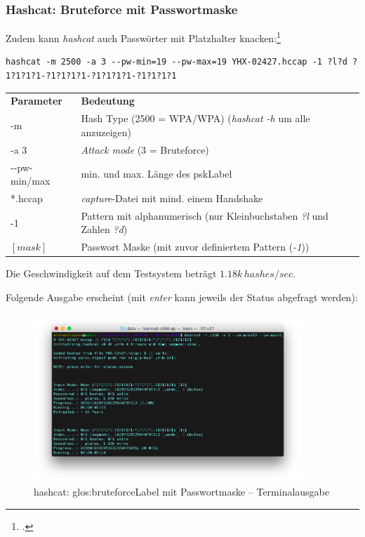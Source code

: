\subsubsection{Hashcat: Bruteforce mit Passwortmaske}
Zudem kann \textit{hashcat} auch Passwörter mit Platzhalter knacken:\footcite{mask_attack_hashcat_wiki_2015-04-13}
\begin{lstlisting}[style=lstStyleFramed]
hashcat -m 2500 -a 3 --pw-min=19 --pw-max=19 YHX-02427.hccap -1 ?l?d ?1?1?1?1-?1?1?1?1-?1?1?1?1-?1?1?1?1
\end{lstlisting}
\begin{tabular}{l l}
	\textbf{Parameter} & \textbf{Bedeutung}\\
	-m & Hash Type (2500 = WPA/WPA) (\textit{hashcat -h} um alle anzuzeigen)\\
	-a 3 & \textit{Attack mode} (3 = Bruteforce)\\
	-{}-pw-min/max & min. und max. Länge des \gls{pskLabel}\\
	*.hccap & \textit{capture}-Datei mit mind. einem Handshake\\
	-1 & Pattern mit alphanumerisch (nur Kleinbuchstaben \textit{?l} und Zahlen \textit{?d})\\
	$[mask]$ & Passwort Maske (mit zuvor definiertem Pattern (\textit{-1}))\\
\end{tabular}

Die Geschwindigkeit auf dem Testsystem beträgt $1.18k\,hashes/sec$.

\clearpage
Folgende Ausgabe erscheint (mit \textit{enter} kann jeweils der Status abgefragt werden):
\begin{figure}[H]
	\centering
	\includegraphics[width=0.9\textwidth]{images/wpa/hashcat_bruteforce_pattern.png}
	\caption[hashcat: Bruteforce mit Passwortmaske -- Terminalausgabe]{hashcat: \gls{glos:bruteforceLabel} mit Passwortmaske -- Terminalausgabe}\label{fig:hashcat_bruteforce_pattern}
\end{figure}

